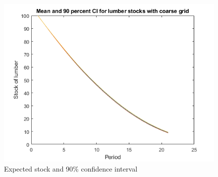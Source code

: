 \documentclass[12pt]{article}
\begin{document}
\clearpage
\begin{figure}[h]
\includegraphics[width=\textwidth]{ci2.png}
\caption{Expected stock and 90\% confidence interval}
\end{figure}
\clearpage
\end{document}
